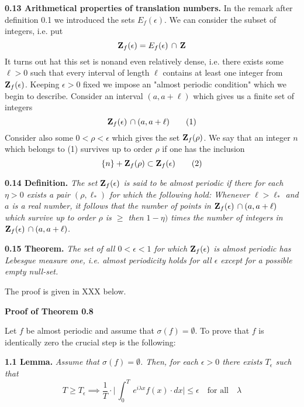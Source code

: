 \documentclass{amsart}
\def\uuu{_}
\def\vvv{-}
\begin{document}
\bigskip

\noindent
{\bf{0.13 Arithmetical properties of translation numbers.}}
In the remark after definition 0.1 we introduced
the sets $E\uuu f(\epsilon)$.
We can consider the subset of integers, i.e. put
\[
{\bf{Z}}\uuu f(\epsilon)=E\uuu f(\epsilon)\,\cap\, {\bf{Z}}
\]
It turns out hat this set is non\empty and even relatively dense, i.e.
there exists some $\ell>0$ such that
every interval of length $\ell$ contains at least one integer from
${\bf{Z}}\uuu f(\epsilon)$.
Keeping $\epsilon>0$ fixed we
impose an "almost periodic condition" which we begin to describe.
Consider an interval $(a,a+\ell)$ which gives us a finite set of integers
\[
{\bf{Z}}\uuu f(\epsilon)\,\cap (a,a+\ell)\tag{1}
\]
Consider also some
$0<\rho<\epsilon$ which  gives the set
${\bf{Z}}\uuu f(\rho)$.
We say that an
integer $n$ which belongs to (1)
survives up to order  $\rho$ if one has the inclusion
\[
\{n\}+{\bf{Z}}\uuu f(\rho)\subset {\bf{Z}}\uuu f(\epsilon)\tag{2}
\]
\bigskip

\noindent
{\bf{0.14 Definition.}}
\emph{The set ${\bf{Z}}\uuu f(\epsilon)$ is said to be almost periodic
if there for each $\eta>0$ exists a pair $(\rho,\ell\uuu *)$
for which the following hold: Whenever $\ell>\ell\uuu *$ and
$a$ is a real number, it follows that the number of points in
${\bf{Z}}\uuu f(\epsilon)\,\cap (a,a+\ell)$
which survive up to order
$\rho$ is $\geq$ then 
$1\vvv\eta)$ times the number of integers in 
${\bf{Z}}\uuu f(\epsilon)\,\cap (a,a+\ell)$.}
\medskip


\noindent
{\bf{0.15 Theorem.}}
\emph{The set of all $0<\epsilon<1$ for which
${\bf{Z}}\uuu f(\epsilon)$ is almost periodic
has Lebesgue measure one, i.e. almost periodicity 
holds for all $\epsilon$ except for
a possible empty null\vvv set.}
\medskip

\noindent 
The proof is given in XXX below.



\bigskip






\centerline{\bf{Proof of Theorem 0.8}}
\bigskip

\noindent
Let $f$ be almost periodic and assume that $\sigma(f)=\emptyset$. To prove that
$f$ is identically zero the crucial step is the following:

\medskip

\noindent
{\bf{1.1 Lemma.}}
\emph{Assume that $\sigma(f)=\emptyset$.
Then, for each $\epsilon>0$ 
there exists $T\uuu \epsilon$ such that}
\[
T\geq T\uuu\epsilon\implies
\frac{1}{T}\cdot \bigl|\, \int\uuu 0^T\,e^{i\lambda x} f(x)\cdot dx\bigr|\leq \epsilon
\quad\text{for all}\quad \lambda
\]
\medskip
\end{document}
